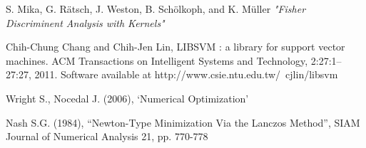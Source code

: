 \documentclass[12pt]{article}
\begin{document}
\begin{thebibliography}{9}

	S. Mika, G. R\"{a}tsch, J. Weston, B. Sch\"{o}lkoph, and K. M\"{u}ller 
	\emph{"Fisher Discriminent Analysis with Kernels"}

 Chih-Chung Chang and Chih-Jen Lin, LIBSVM : a library for support vector machines. ACM Transactions on Intelligent Systems and Technology, 2:27:1--27:27, 2011. Software available at http://www.csie.ntu.edu.tw/~cjlin/libsvm 

Wright S., Nocedal J. (2006), ‘Numerical Optimization’

Nash S.G. (1984), “Newton-Type Minimization Via the Lanczos Method”, SIAM Journal of Numerical Analysis 21, pp. 770-778




\end{thebibliography}
\end{document}
